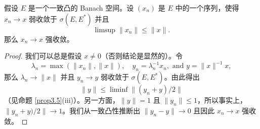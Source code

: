 \begin{proposition}\label{prop3.32}
假设 $E$ 是一个一致凸的 Banach 空间。设 $(x_n)$ 是 $E$ 中的一个序列，使得 $x_n \to x$ 弱收敛于 $\sigma(E, E^*)$ 并且
\[ \limsup \|x_n\| \le \|x\|. \]
那么 $x_n \to x$ 强收敛。
\end{proposition}

\begin{proof}
我们可以总是假设 $x \neq 0$（否则结论是显然的）。令
\[ \lambda_n = \max(\|x_n\|, \|x\|), \quad y_n = \lambda_n^{-1} x_n, \text{ and } y = \|x\|^{-1}x, \]
那么 $\lambda_n \to \|x\|$ 并且 $y_n \to y$ 弱收敛于 $\sigma(E, E^*)$。由此得出
\[ \|y\| \le \liminf \|(y_n+y)/2\| \]
（见命题 \ref{prop3.5}(iii)）。另一方面，$\|y\|=1$ 且 $\|y_n\| \le 1$，所以事实上，$\|y_n+y)/2\| \to 1$。我们从一致凸性推断出 $\|y_n-y\| \to 0$ 且因此 $x_n \to x$ 强收敛。
\end{proof}





